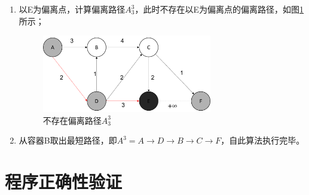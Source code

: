 \begin{enumerate}
    \item 以E为偏离点，计算偏离路径$A_3^3$，此时不存在以E为偏离点的偏离路径，如图\ref{fig:fig28}所示；
    \begin{figure}[H] %
        \centering %
        \includegraphics[width=0.7\textwidth]{png/图片28 不存在偏离路径A3_3} %
        \caption{不存在偏离路径$A^3_3$} %
        \label{fig:fig28} %
    \end{figure}

    \item 从容器B取出最短路径，即$A^3=A\to D\to B\to C\to F$，自此算法执行完毕。
\end{enumerate}


\section{程序正确性验证}\label{sec:程序正确性验证}

